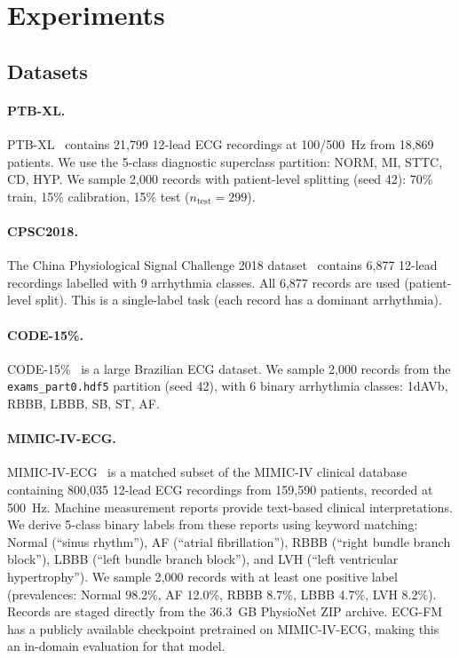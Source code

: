 \section{Experiments}
\label{sec:experiments}

\subsection{Datasets}

\paragraph{PTB-XL.}
PTB-XL~\citep{strodthoff2020ptbxl} contains 21,799 12-lead ECG recordings at 100/500~Hz
from 18,869 patients. We use the 5-class diagnostic superclass partition:
NORM, MI, STTC, CD, HYP. We sample 2,000 records with patient-level splitting (seed 42):
70\% train, 15\% calibration, 15\% test ($n_\mathrm{test}=299$).

\paragraph{CPSC2018.}
The China Physiological Signal Challenge 2018 dataset~\citep{cpsc2018} contains 6,877
12-lead recordings labelled with 9 arrhythmia classes. All 6,877 records are used
(patient-level split). This is a single-label task (each record has a dominant arrhythmia).

\paragraph{CODE-15\%.}
CODE-15\%~\citep{ribeiro2021code15} is a large Brazilian ECG dataset.
We sample 2,000 records from the \texttt{exams\_part0.hdf5} partition (seed 42),
with 6 binary arrhythmia classes: 1dAVb, RBBB, LBBB, SB, ST, AF.

\paragraph{MIMIC-IV-ECG.}
MIMIC-IV-ECG~\citep{mimicivecg2023} is a matched subset of the MIMIC-IV clinical database
containing 800{,}035 12-lead ECG recordings from 159{,}590 patients, recorded at 500~Hz.
Machine measurement reports provide text-based clinical interpretations. We derive 5-class
binary labels from these reports using keyword matching: Normal (``sinus rhythm''), AF
(``atrial fibrillation''), RBBB (``right bundle branch block''), LBBB (``left bundle branch
block''), and LVH (``left ventricular hypertrophy''). We sample 2{,}000 records with
at least one positive label (prevalences: Normal 98.2\%, AF 12.0\%, RBBB 8.7\%, LBBB 4.7\%,
LVH 8.2\%). Records are staged directly from the 36.3~GB PhysioNet ZIP archive.
ECG-FM has a publicly available checkpoint pretrained on MIMIC-IV-ECG, making this
an in-domain evaluation for that model.

